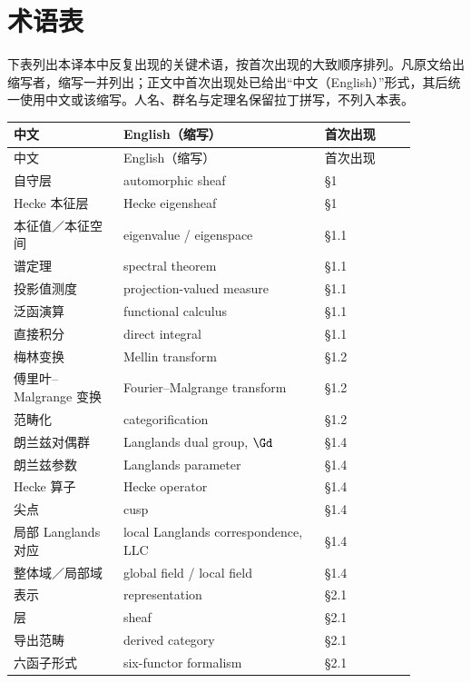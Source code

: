 ﻿\clearpage
\section*{术语表}

下表列出本译本中反复出现的关键术语，按首次出现的大致顺序排列。凡原文给出缩写者，缩写一并列出；正文中首次出现处已给出“中文（English）”形式，其后统一使用中文或该缩写。人名、群名与定理名保留拉丁拼写，不列入本表。

\begin{center}
\small
\begin{longtable}{@{}>{\raggedright\arraybackslash}p{0.24\linewidth}>{\raggedright\arraybackslash}p{0.44\linewidth}>{\raggedright\arraybackslash}p{0.20\linewidth}@{}}
\toprule
中文 & English（缩写） & 首次出现 \\
\midrule
\endfirsthead
\toprule
中文 & English（缩写） & 首次出现 \\
\midrule
\endhead
\bottomrule
\endfoot
自守层 & automorphic sheaf & §1 \\
Hecke 本征层 & Hecke eigensheaf & §1 \\
本征值／本征空间 & eigenvalue / eigenspace & §1.1 \\
谱定理 & spectral theorem & §1.1 \\
投影值测度 & projection-valued measure & §1.1 \\
泛函演算 & functional calculus & §1.1 \\
直接积分 & direct integral & §1.1 \\
梅林变换 & Mellin transform & §1.2 \\
傅里叶--Malgrange 变换 & Fourier--Malgrange transform & §1.2 \\
范畴化 & categorification & §1.2 \\
朗兰兹对偶群 & Langlands dual group, $\Gd$ & §1.4 \\
朗兰兹参数 & Langlands parameter & §1.4 \\
Hecke 算子 & Hecke operator & §1.4 \\
尖点 & cusp & §1.4 \\
局部 Langlands 对应 & local Langlands correspondence, LLC & §1.4 \\
整体域／局部域 & global field / local field & §1.4 \\
表示 & representation & §2.1 \\
层 & sheaf & §2.1 \\
导出范畴 & derived category & §2.1 \\
六函子形式 & six-functor formalism & §2.1 \\

\end{longtable}
\end{center}
